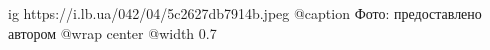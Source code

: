  
 
 
 
 

\ifcmt
  ig https://i.lb.ua/042/04/5c2627db7914b.jpeg
	@caption Фото: предоставлено автором
  @wrap center
  @width 0.7
\fi
